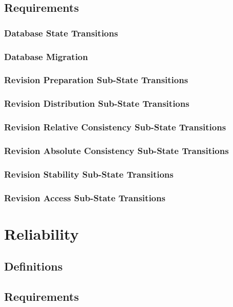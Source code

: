 \documentclass[a4paper, 12pt]{book}
\begin{document}
\section{Requirements}

\subsection{Database State Transitions}
\subsection{Database Migration}
\subsection{Revision Preparation Sub-State Transitions}
\subsection{Revision Distribution Sub-State Transitions}
\subsection{Revision Relative Consistency Sub-State Transitions}
\subsection{Revision Absolute Consistency Sub-State Transitions}
\subsection{Revision Stability Sub-State Transitions}
\subsection{Revision Access Sub-State Transitions}




\chapter{Reliability}
\label{sec:reliability} 

\section{Definitions}

\section{Requirements}
\end{document}
